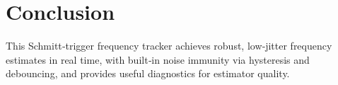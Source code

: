 \documentclass[11pt,letterpaper]{article}
\begin{document}
\section{Conclusion}
This Schmitt‐trigger frequency tracker achieves robust, low‐jitter frequency estimates in real time, with built‐in noise immunity via hysteresis and debouncing, and provides useful diagnostics for estimator quality.
\end{document}
